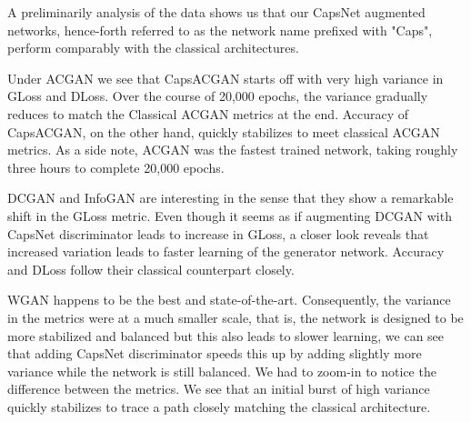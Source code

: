 A preliminarily analysis of the data shows us that our CapsNet augmented networks, hence-forth referred to as the network name prefixed with "Caps", perform comparably with the classical architectures. 
\par\bigskip

Under ACGAN we see that CapsACGAN starts off with very high variance in GLoss and DLoss. Over the course of 20,000 epochs, the variance gradually reduces to match the Classical ACGAN metrics at the end. Accuracy of CapsACGAN, on the other hand, quickly stabilizes to meet classical ACGAN metrics. As a side note, ACGAN was the fastest trained network, taking roughly three hours to complete 20,000 epochs.
\par\bigskip

DCGAN and InfoGAN are interesting in the sense that they show a remarkable shift in the GLoss metric. Even though it seems as if augmenting DCGAN with CapsNet discriminator leads to increase in GLoss, a closer look reveals that increased variation leads to faster learning of the generator network. Accuracy and DLoss follow their classical counterpart closely.
\par\bigskip

WGAN happens to be the best and state-of-the-art. Consequently, the variance in the metrics were at a much smaller scale, that is, the network is designed to be more stabilized and balanced but this also leads to slower learning, we can see that adding CapsNet discriminator speeds this up by adding slightly more variance while the network is still balanced. We had to zoom-in to notice the difference between the metrics. We see that an initial burst of high variance quickly stabilizes to trace a path closely matching the classical architecture.
\par\bigskip

